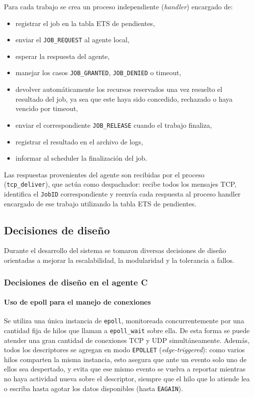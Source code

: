 \documentclass[a4paper,10pt]{article}
\begin{document}
\noindent Para cada trabajo se crea un proceso independiente (\textit{handler}) encargado de:

\begin{itemize}
    \item registrar el job en la tabla ETS de pendientes,
    \item enviar el \texttt{JOB\_REQUEST} al agente local,
    \item esperar la respuesta del agente,
    \item manejar los casos \texttt{JOB\_GRANTED}, \texttt{JOB\_DENIED} o timeout,
    \item devolver automáticamente los recursos reservados una vez resuelto el
    resultado del job, ya sea que este haya sido concedido, rechazado o haya
    vencido por timeout,
    \item enviar el correspondiente \texttt{JOB\_RELEASE} cuando el trabajo finaliza,
    \item registrar el resultado en el archivo de logs,
    \item informar al scheduler la finalización del job.
\end{itemize}

\noindent Las respuestas provenientes del agente son recibidas por el proceso (\texttt{tcp\_deliver}), que actúa como despachador: recibe todos los mensajes TCP, identifica el \texttt{JobID} correspondiente y reenvía cada respuesta al proceso handler encargado de ese trabajo utilizando la tabla ETS de pendientes.
\subsection{Decisiones de diseño}

\noindent Durante el desarrollo del sistema se tomaron diversas decisiones de diseño orientadas a mejorar la escalabilidad, la modularidad y la tolerancia a fallos.

\subsubsection{Decisiones de diseño en el agente C}

\paragraph{Uso de epoll para el manejo de conexiones} 
Se utiliza una única instancia de \texttt{epoll}, monitoreada concurrentemente por una cantidad fija de 
hilos que llaman a \texttt{epoll\_wait} sobre ella. De esta forma se puede atender una gran cantidad
de conexiones TCP y UDP simultáneamente.
Además, todos los descriptores se agregan en modo \texttt{EPOLLET}
(\textit{edge-triggered}): como varios hilos comparten la misma instancia, esto asegura que ante
un evento solo uno de ellos sea despertado, y evita que ese mismo evento se vuelva a reportar
mientras no haya actividad nueva sobre el descriptor, siempre que el hilo que lo atiende lea o
escriba hasta agotar los datos disponibles (hasta \texttt{EAGAIN}).
\end{document}
